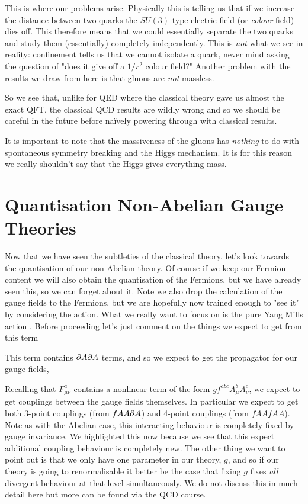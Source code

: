 This is where our problems arise. Physically this is telling us that if we increase the distance between two quarks the $SU(3)$-type electric field (or \textit{colour} field) dies off. This therefore means that we could essentially separate the two quarks and study them (essentially) completely independently. This is \textit{not} what we see in reality: confinement tells us that we cannot isolate a quark, never mind asking the question of "does it give off a $1/r^2$ colour field?" Another problem with the results we draw from here is that gluons are \textit{not} massless. 

So we see that, unlike for QED where the classical theory gave us almost the exact QFT, the classical QCD results are wildly wrong and so we should be careful in the future before na\"{i}vely powering through with classical results. 

\br 
    It is important to note that the massiveness of the gluons has \textit{nothing} to do with spontaneous symmetry breaking and the Higgs mechanism. It is for this reason we really shouldn't say that the Higgs gives everything mass. 
\er 

\section{Quantisation Non-Abelian Gauge Theories}

Now that we have seen the subtleties of the classical theory, let's look towards the quantisation of our non-Abelian theory. Of course if we keep our Fermion content we will also obtain the quantisation of the Fermions, but we have already seen this, so we can forget about it. Note we also drop the calculation of the gauge fields to the Fermions, but we are hopefully now trained enough to "see it" by considering the action. What we really want to focus on is the pure Yang Mills action . Before proceeding let's just comment on the things we expect to get from this term
\ben[label=(\roman*)]
    \item This term contains $\partial A \partial A$ terms, and so we expect to get the propagator for our gauge fields, 
    \item Recalling that $F_{\mu\nu}^a$ contains a nonlinear term of the form $gf^{abc} A^b_{\mu}A^c_{\nu}$, we expect to get couplings between the gauge fields themselves. In particular we expect to get both 3-point couplings (from $fAA\partial A$) and 4-point couplings (from $fAA fAA$). Note as with the Abelian case, this interacting behaviour is completely fixed by gauge invariance.
\een 
We highlighted this now because we see that this expect additional coupling behaviour is completely new. The other thing we want to point out is that we only have one parameter in our theory, $g$, and so if our theory is going to renormalisable it better be the case that fixing $g$ fixes \textit{all} divergent behaviour at that level simultaneously. We do not discuss this in much detail here but more can be found via the QCD course. 

